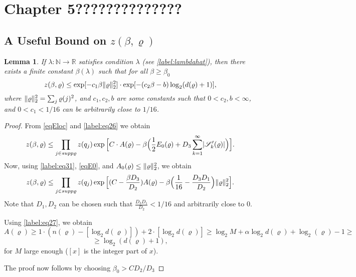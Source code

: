 \documentclass[11pt,reqno]{article}
\DeclarePairedDelimiter\abs{\lvert}{\rvert}%
\DeclarePairedDelimiter\norm{\lVert}{\rVert}%
\newtheorem{lemma}[thm]{Lemma}
\theoremstyle{definition}
\numberwithin{equation}{section}
\begin{document}
\section{Chapter 5??????????????}
\subsection{A Useful Bound on $z(\beta, \varrho)$}
\begin{lemma}
If $\lambda: \mathbb{N} \rightarrow \mathbb{R}$ satisfies condition $\lambda$ (see \eqref{label:lambdahat}), then there exists a finite constant $\beta(\lambda)$ such that for all $\beta \geq \beta_0$
\begin{equation}
z(\beta, \varrho) \leq \exp[-c_1\beta \norm{\varrho}_2^2] \cdot \exp[-(c_2\beta-b) \log_2(d(\varrho) + 1)],
\end{equation}
where $\norm{\varrho}_2^2 = \sum_j \varrho(j)^2$, and $c_1, c_2, b$ are some constants such that $0 < c_2, b < \infty$, and $0 < c_1 < 1/16$ can be arbitrarily close to $1/16$.
\end{lemma}
\begin{proof}
From \eqref{eqEloc} and \eqref{label:eq26} we obtain
$$
z(\beta,\varrho) \leq \prod_{j \in supp\varrho} z(q_j) \exp\Big[C \cdot A(\varrho)-\beta \Big(\frac{1}{2}E_0(\varrho) + D_3\sum_{k=1}^\infty \abs{\SqrsSetTagOf{k}{\varrho}}\Big)\Big].
$$
Now, using \eqref{label:eq31}, \eqref{eqE0}, and $A_0(\varrho) \leq \norm{\varrho}_2^2$, we obtain
$$
z(\beta,\varrho) \leq \prod_{j \in supp\varrho} z(q_j) \exp\Big[
(C-\frac{\beta D_3}{D_2})A(\varrho) - 
\beta \Big(\frac{1}{16} - \frac{D_3D_1}{D_2}\Big) \norm{\varrho}_2^2
\Big].
$$
Note that $D_1, D_2$ can be chosen such that $\frac{D_3D_1}{D_2} < 1/16$ and arbitrarily close to 0.

Using \eqref{label:eq27}, we obtain
$$
A(\varrho) \geq 1 \cdot (n(\varrho) - [\log_2d(\varrho)]) + 2 \cdot [\log_2d(\varrho)] \geq \log_2M + \alpha\log_2d(\varrho) + \log_2(\varrho) - 1 \geq
$$
$$
\geq \log_2(d(\varrho) + 1),
$$
for $M$ large enough ($[x]$ is the integer part of $x$).

The proof now follows by choosing $\beta_0 > CD_2/D_3$ 
\end{proof}
\end{document}
